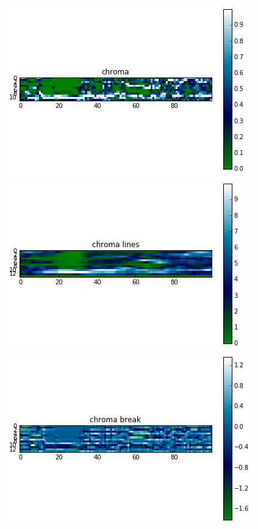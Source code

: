 \documentclass[9pt]{article}
\begin{document}
\begin{figure}[H]
    \centering
    
    \begin{minipage}[b]{0.3\textwidth}
        \includegraphics[width=\textwidth]{chroma-bare.png}
    \end{minipage}
    \hfill
    \begin{minipage}[b]{0.3\textwidth}
        \includegraphics[width=\textwidth]{chroma-lines.png}
    \end{minipage}
    \hfill
    \begin{minipage}[b]{0.3\textwidth}
        \includegraphics[width=\textwidth]{chromc-line-end-.png}

\end{minipage}
\end{figure}
\end{document}
